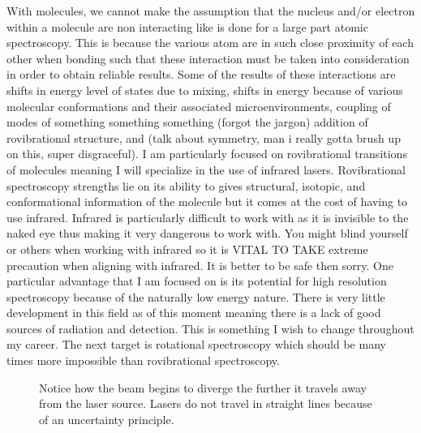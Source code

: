 \documentclass[11pt,a4paper]{book}
\newcommand{\imginput}[1]{} %
\begin{document}
		With molecules, we cannot make the assumption that the nucleus and/or electron within a molecule are non interacting like is done for a large part atomic spectroscopy. This is because the various atom are in such close proximity of each other when bonding such that these interaction must be taken into consideration in order to obtain reliable results. Some of the results of these interactions are shifts in energy level of states due to mixing, shifts in energy because of various molecular conformations and their associated microenvironments, coupling of modes of something something something (forgot the jargon) addition of rovibrational structure, and (talk about symmetry, man i really gotta brush up on this, super disgraceful). I am particularly focused on rovibrational transitions of molecules meaning I will specialize in the use of infrared lasers. Rovibrational spectroscopy strengths lie on its ability to gives structural, isotopic, and conformational information of the molecule but it comes at the cost of having to use infrared. Infrared is particularly difficult to work with as it is invisible to the naked eye thus making it very dangerous to work with. You might blind yourself or others when working with infrared so it is VITAL TO TAKE extreme precaution when aligning with infrared. It is better to be safe then sorry. One particular advantage that I am focused on is its potential for high resolution spectroscopy because of the naturally low energy nature. There is very little development in this field as of this moment meaning there is a lack of good sources of radiation and detection. This is something I wish to change throughout my career. The next target is rotational spectroscopy which should be many times more impossible than rovibrational spectroscopy.
		
		\begin{figure} [!ht]
			\centering
			\def\svgwidth{\columnwidth}
			\Huge
			\resizebox{10cm}{!}{\imginput{images/laser-gaussian-beam.pdf_tex}}
			\caption{Notice how the beam begins to diverge the further it travels away from the laser source. Lasers do not travel in straight lines because of an uncertainty principle.}
			\label{fig:laser-gaussian-beam}
		\end{figure}
		
\end{document}
